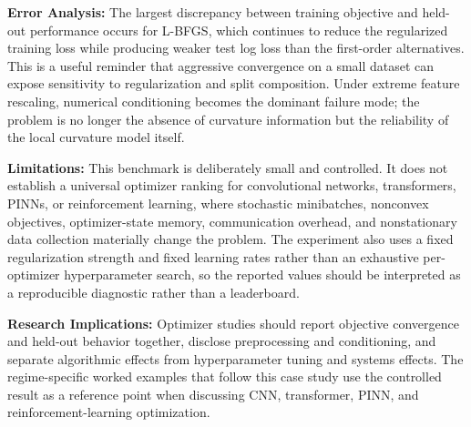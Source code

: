 \textbf{Error Analysis:} The largest discrepancy between training objective and held-out performance occurs for L-BFGS, which continues to reduce the regularized training loss while producing weaker test log loss than the first-order alternatives. This is a useful reminder that aggressive convergence on a small dataset can expose sensitivity to regularization and split composition. Under extreme feature rescaling, numerical conditioning becomes the dominant failure mode; the problem is no longer the absence of curvature information but the reliability of the local curvature model itself.

\textbf{Limitations:} This benchmark is deliberately small and controlled. It does not establish a universal optimizer ranking for convolutional networks, transformers, PINNs, or reinforcement learning, where stochastic minibatches, nonconvex objectives, optimizer-state memory, communication overhead, and nonstationary data collection materially change the problem. The experiment also uses a fixed regularization strength and fixed learning rates rather than an exhaustive per-optimizer hyperparameter search, so the reported values should be interpreted as a reproducible diagnostic rather than a leaderboard.

\textbf{Research Implications:} Optimizer studies should report objective convergence and held-out behavior together, disclose preprocessing and conditioning, and separate algorithmic effects from hyperparameter tuning and systems effects. The regime-specific worked examples that follow this case study use the controlled result as a reference point when discussing CNN, transformer, PINN, and reinforcement-learning optimization.
